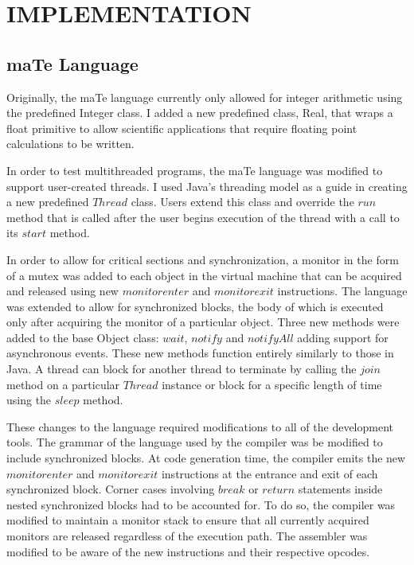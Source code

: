 \chapter{IMPLEMENTATION}
\label{IMPLEMENTATION}

\section{maTe Language}

Originally, the maTe language currently only allowed for integer
arithmetic using the predefined Integer class.  I added a new
predefined class, Real, that wraps a float primitive to allow
scientific applications that require floating point calculations to be
written.

In order to test multithreaded programs, the maTe language was
modified to support user-created threads.  I used Java's threading
model as a guide in creating a new predefined $Thread$ class.  Users
extend this class and override the $run$ method that is called after
the user begins execution of the thread with a call to its $start$
method.

In order to allow for critical sections and synchronization, a monitor
in the form of a mutex was added to each object in the virtual machine
that can be acquired and released using new $monitorenter$ and
$monitorexit$ instructions.  The language was extended to allow for
synchronized blocks, the body of which is executed only after
acquiring the monitor of a particular object.  Three new methods were
added to the base Object class: $wait$, $notify$ and $notifyAll$
adding support for asynchronous events.  These new methods function
entirely similarly to those in Java.  A thread can block for another
thread to terminate by calling the $join$ method on a particular
$Thread$ instance or block for a specific length of time using the
$sleep$ method.

These changes to the language required modifications to all of the
development tools.  The grammar of the language used by the compiler
was be modified to include synchronized blocks.  At code generation
time, the compiler emits the new $monitorenter$ and $monitorexit$
instructions at the entrance and exit of each synchronized block.
Corner cases involving $break$ or $return$ statements inside nested
synchronized blocks had to be accounted for.  To do so, the compiler
was modified to maintain a monitor stack to ensure that all currently
acquired monitors are released regardless of the execution path.  The
assembler was modified to be aware of the new instructions and their
respective opcodes.

